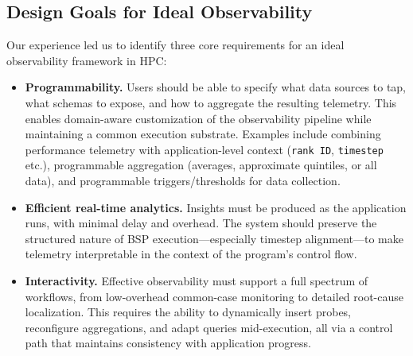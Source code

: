 \documentclass[ letterpaper, DIV=11, numbers=noendperiod]{scrartcl}
\begin{document}

\subsection{Design Goals for Ideal Observability}

Our experience led us to identify three core requirements for an ideal
observability framework in HPC:

\begin{itemize}
	\item \textbf{Programmability.} Users should be able to specify what data
	      sources to tap, what schemas to expose, and how to aggregate the resulting
	      telemetry. This enables domain-aware customization of the observability
	      pipeline while maintaining a common execution substrate. Examples include combining performance telemetry with application-level context (\texttt{rank ID}, \texttt{timestep} etc.), programmable aggregation (averages, approximate quintiles, or all data), and programmable triggers/thresholds for data collection.

	\item \textbf{Efficient real-time analytics.} Insights must be produced as
	      the application runs, with minimal delay and overhead. The system should
	      preserve the structured nature of BSP execution---especially timestep
	      alignment---to make telemetry interpretable in the context of the program’s
	      control flow.

	\item \textbf{Interactivity.} Effective observability must support a full
	      spectrum of workflows, from low-overhead common-case monitoring to detailed
	      root-cause localization. This requires the ability to dynamically insert
	      probes, reconfigure aggregations, and adapt queries mid-execution, all via a
	      control path that maintains consistency with application progress.
\end{itemize}
\end{document}
